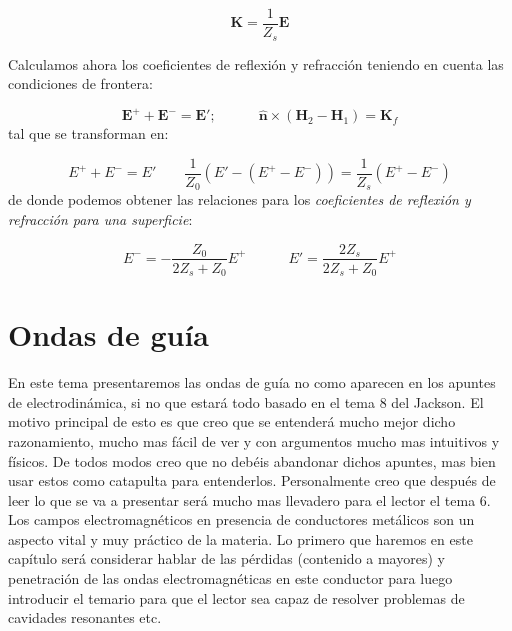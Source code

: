 \documentclass[12pt,a4paper]{article}
\newcommand{\tquad}{\quad \quad \quad}
\newcommand{\En}{\mathbf{E}}
\newcommand{\Hn}{\mathbf{H}}
\newcommand{\Kn}{\mathbf{K}}
\newcommand{\hnn}{\hat{\mathbf{n}}}
\numberwithin{equation}{section}
\numberwithin{figure}{section}
\begin{document}
\begin{equation}
\Kn = \dfrac{1}{Z_s} \En
\end{equation}

Calculamos ahora los coeficientes de reflexión y refracción teniendo en cuenta las condiciones de frontera:

\begin{equation}
\En^+ + \En^- = \En'; \tquad \hnn \times (\Hn_2 - \Hn_1) = \Kn_f
\end{equation}
tal que se transforman en:

\begin{equation}
E^+ + E^- = E' \quad \quad  \dfrac{1}{Z_0} (E' - (E^+ - E^-)) = \dfrac{1}{Z_s} (E^+ - E^-)
\end{equation}
de donde podemos obtener las relaciones para los \textit{coeficientes de reflexión y refracción para una superficie}:

\begin{equation}
E^- = - \dfrac{Z_0}{2 Z_s + Z_0} E^+ \tquad E' = \dfrac{2Z_s}{2Z_s + Z_0} E^+
\end{equation}


\newpage

\section{Ondas de guía}

En este tema presentaremos las ondas de guía no como aparecen en los apuntes de electrodinámica, si no que estará todo basado en el tema 8 del Jackson. El motivo principal de esto es que creo que se entenderá mucho mejor dicho razonamiento, mucho mas fácil de ver y con argumentos mucho mas intuitivos y físicos. De todos modos creo que no debéis abandonar dichos apuntes, mas bien usar estos como catapulta para entenderlos. Personalmente creo que después de leer lo que se va a presentar será mucho mas llevadero para el lector el tema 6. \\

Los campos electromagnéticos en presencia de conductores metálicos son un aspecto vital y muy práctico de la materia. Lo primero que haremos en este capítulo será considerar hablar de las pérdidas (contenido a mayores) y penetración de las ondas electromagnéticas en este conductor para luego introducir el temario para que el lector sea capaz de resolver problemas de cavidades resonantes etc. \\
\end{document}
